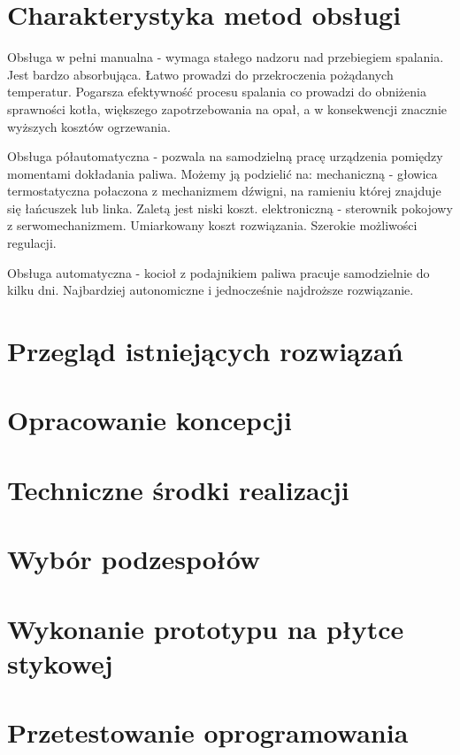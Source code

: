 \documentclass[11pt,a4paper]{report}
\begin{document}
 \chapter{Charakterystyka metod obsługi} 
 Obsługa w pełni manualna - wymaga stałego nadzoru nad przebiegiem spalania. Jest bardzo absorbująca. Łatwo prowadzi do przekroczenia pożądanych temperatur. Pogarsza efektywność procesu spalania co prowadzi do obniżenia sprawności kotła, większego zapotrzebowania na opał, a w konsekwencji znacznie wyższych kosztów ogrzewania.
 
 Obsługa półautomatyczna - pozwala na samodzielną pracę urządzenia pomiędzy momentami dokładania paliwa. Możemy ją podzielić na:
 mechaniczną - głowica termostatyczna połaczona z mechanizmem dźwigni, na ramieniu której znajduje się łańcuszek lub linka. Zaletą jest niski koszt.
 elektroniczną - sterownik pokojowy z serwomechanizmem. Umiarkowany koszt rozwiązania. Szerokie możliwości regulacji.
 
 Obsługa automatyczna - kocioł z podajnikiem paliwa pracuje samodzielnie do kilku dni. Najbardziej autonomiczne i jednocześnie najdroższe rozwiązanie.
 
 
 \chapter{Przegląd istniejących rozwiązań}
  
 \chapter{Opracowanie koncepcji}
 
 \chapter{Techniczne środki realizacji}
 
 \chapter{Wybór podzespołów}
 
 \chapter{Wykonanie prototypu na płytce stykowej}
 
 \chapter{Przetestowanie oprogramowania}
 
\end{document}
